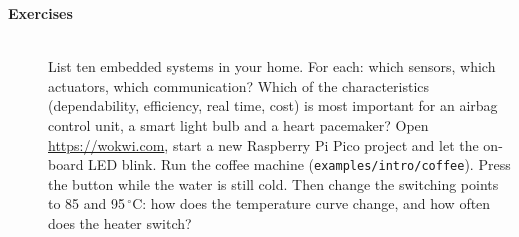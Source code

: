 \begin{description}
\item[{\rot\bf Exercises}]~\\[-\lblskip]
\bi
	\ite List ten embedded systems in your home. For each: which sensors, which actuators, which communication?
	\ite Which of the characteristics (dependability, efficiency, real time, cost) is most important for an airbag control unit, a smart light bulb and a heart pacemaker?
	\ite Open \url{https://wokwi.com}, start a new Raspberry Pi Pico project and let the on-board LED blink.
	\ite Run the coffee machine (\texttt{examples/intro/coffee}). Press the button while the water is still cold. Then change the switching points to 85 and 95\,$^\circ$C: how does the temperature curve change, and how often does the heater switch?
\ei
\end{description}
